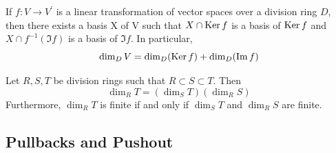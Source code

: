 \begin{corollary}
    If $f: V \rightarrow V^{\prime}$ is a linear transformation of vector spaces over a division ring $D$, then there exists a basis X of V such that $X \cap \operatorname{\operatorname{Ker}} f$ is a basis of $\operatorname{\operatorname{Ker}} f$ and $X \cap f^{-1}\left(\Im f\right)$ is a basis of $\Im f$.
    In particular,
    \begin{equation*}
        \dim_{D} V
        =
        \dim_{D}(\operatorname{\operatorname{Ker}} f)+\dim_{D}(\Im f)
    \end{equation*}
\end{corollary}

\begin{theorem}
    Let ${R}, {S}, {T}$ be division rings such that $R \subset {S} \subset {T}$. Then
    \begin{equation*}
        \dim_{{R}} {T}
        =
        \left(\dim_{{S}} {T}\right)\left(\dim_{{R}} {S}\right)
    \end{equation*}
    Furthermore, $\dim_{{R}} {T}$ is finite if and only if $\dim_{{S}} {T}$ and $\dim_{{R}} {S}$ are finite.
\end{theorem}

\subsection{Pullbacks and Pushout}


